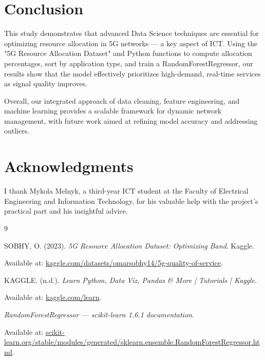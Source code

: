 \documentclass[a4paper, 10pt, twocolumn]{article}
\begin{document}
\section{Conclusion}

This study demonstrates that advanced Data Science techniques are essential for optimizing resource allocation in 5G networks — a key aspect of ICT. Using the "5G Resource Allocation Dataset" and Python functions to compute allocation percentages, sort by application type, and train a RandomForestRegressor, our results show that the model effectively prioritizes high-demand, real-time services as signal quality improves.


Overall, our integrated approach of data cleaning, feature engineering, and machine learning provides a scalable framework for dynamic network management, with future work aimed at refining model accuracy and addressing outliers.

\section*{Acknowledgments}

I thank Mykola Melnyk, a third-year ICT student at the Faculty of Electrical Engineering and Information Technology, for his valuable help with the project's practical part and his insightful advice.


\begin{thebibliography}{9}

SOBHY, O. (2023). \emph{5G Resource Allocation Dataset: Optimizing Band}. Kaggle. 

Available at: \url{kaggle.com/datasets/omarsobhy14/5g-quality-of-service}.

KAGGLE. (n.d.). \emph{Learn Python, Data Viz, Pandas \& More | Tutorials | Kaggle}. 

Available at: \url{kaggle.com/learn}.

\emph{RandomForestRegressor — scikit-learn 1.6.1 documentation}. 

Available at: \url{scikit-learn.org/stable/modules/generated/sklearn.ensemble.RandomForestRegressor.html}.

\end{thebibliography}
\end{document}
